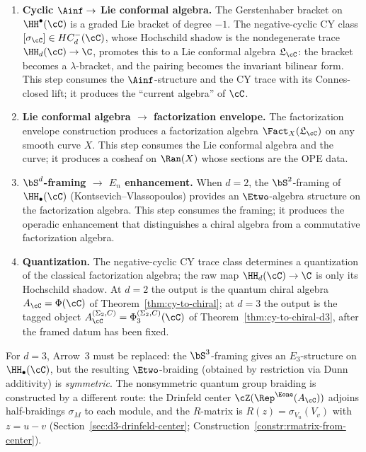 \begin{enumerate}[label=\textbf{Arrow \arabic*.}]
 \item \textbf{Cyclic $\Ainf \to$ Lie conformal algebra.} The Gerstenhaber bracket on $\HH^\bullet(\cC)$ is a graded Lie bracket of degree $-1$. The negative-cyclic CY class $[\sigma_\cC]\in HC^-_d(\cC)$, whose Hochschild shadow is the nondegenerate trace $\HH_d(\cC)\to\C$, promotes this to a Lie conformal algebra $\mathfrak{L}_\cC$: the bracket becomes a $\lambda$-bracket, and the pairing becomes the invariant bilinear form. This step consumes the $\Ainf$-structure and the CY trace with its Connes-closed lift; it produces the ``current algebra'' of $\cC$.
 \item \textbf{Lie conformal algebra $\to$ factorization envelope.} The factorization envelope construction produces a factorization algebra $\Fact_X(\mathfrak{L}_\cC)$ on any smooth curve $X$. This step consumes the Lie conformal algebra and the curve; it produces a cosheaf on $\Ran(X)$ whose sections are the OPE data.
 \item \textbf{$\bS^d$-framing $\to$ $E_n$ enhancement.} When $d = 2$, the $\bS^2$-framing of $\HH_\bullet(\cC)$ (Kontsevich--Vlassopoulos) provides an $\Etwo$-algebra structure on the factorization algebra. This step consumes the framing; it produces the operadic enhancement that distinguishes a chiral algebra from a commutative factorization algebra.
 \item \textbf{Quantization.} The negative-cyclic CY trace class determines a quantization of the classical factorization algebra; the raw map $\HH_d(\cC)\to\C$ is only its Hochschild shadow. At $d = 2$ the output is the quantum chiral algebra $A_\cC = \Phi(\cC)$ of Theorem~\ref{thm:cy-to-chiral}; at $d = 3$ the output is the tagged object $A_\cC^{(\Sigma_2,C)} = \Phi_3^{(\Sigma_2,C)}(\cC)$ of Theorem~\ref{thm:cy-to-chiral-d3}, after the framed datum has been fixed.
\end{enumerate}

For $d = 3$, Arrow~3 must be replaced: the $\bS^3$-framing gives an $E_3$-structure on $\HH_\bullet(\cC)$, but the resulting $\Etwo$-braiding (obtained by restriction via Dunn additivity) is \emph{symmetric}. The nonsymmetric quantum group braiding is constructed by a different route: the Drinfeld center $\cZ(\Rep^{\Eone}(A_\cC))$ adjoins half-braidings $\sigma_M$ to each module, and the $R$-matrix is $R(z) = \sigma_{V_u}(V_v)$ with $z = u - v$ (Section~\ref{sec:d3-drinfeld-center}; Construction~\ref{constr:rmatrix-from-center}).


